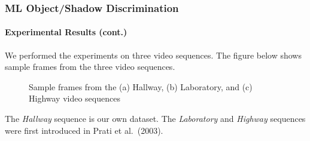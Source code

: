 \begin{frame}
    \frametitle{ML Object/Shadow Discrimination}
    \framesubtitle{Experimental Results (cont.)}

    We performed the experiments on three video sequences. The figure 
    below shows sample frames from the three video sequences.
  
    \begin{figure}
        \centering
        \hspace{0.05cm}
        \hspace{0.05cm}
        \caption{Sample frames from the (a) Hallway, (b) Laboratory, and (c)
            Highway video sequences}
        \label{fig:benchmark}
    \end{figure}

    The {\em Hallway} sequence is our own dataset. The {\em Laboratory} and 
    {\em Highway} sequences were first introduced in Prati et al.\ (2003).

\end{frame}

